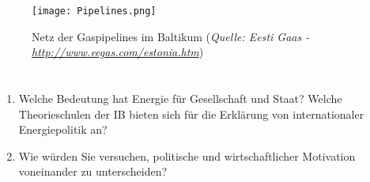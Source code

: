 \documentclass[11pt,a4paper]{article}
\begin{document}
\newpage



\begin{figure}[htb]


  \begin{centering}
   \texttt{[image: Pipelines.png]} %
    \caption{\textsf{Netz der Gaspipelines im Baltikum (\small{\textsl{Quelle:
	Eesti Gaas -\textcolor{MidnightBlue}{\url{http://www.eegas.com/estonia.htm}}})}}}

  \end{centering}

\end{figure}

\newpage

\section*{}

\begin{enumerate}

\item Welche Bedeutung hat Energie für Gesellschaft und Staat? Welche Theorieschulen der IB bieten sich für die Erklärung von internationaler Energiepolitik an?

\item Wie würden Sie versuchen, politische und wirtschaftlicher Motivation voneinander zu unterscheiden?


\end{enumerate}
\end{document}
